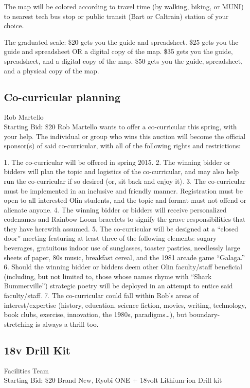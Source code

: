 \documentclass[11pt]{article}
\begin{document}
The map will be colored according to travel time (by walking, biking, or MUNI) to nearest tech bus stop or public transit (Bart or Caltrain) station of your choice. 

The graduated scale:
\$20 gets you the guide and spreadsheet.
\$25 gets you the guide and spreadsheet OR a digital copy of the map.
\$35 gets you the guide, spreadsheet, and a digital copy of the map.
\$50 gets you the guide, spreadsheet, and a physical copy of the map.
\subsection{Co-curricular planning}
Rob Martello
\\
Starting Bid: \$20
\newline
Rob Martello wants to offer a co-curricular this spring, with your help.  The individual or group who wins this auction will become the official sponsor(s) of said co-curricular, with all of the following rights and restrictions:

1.        The co-curricular will be offered in spring 2015. 
2.        The winning bidder or bidders will plan the topic and logistics of the co-curricular, and may also help run the co-curricular if so desired (or, sit back and enjoy it).
3.        The co-curricular must be implemented in an inclusive and friendly manner.  Registration must be open to all interested Olin students, and the topic and format must not offend or alienate anyone. 
4.        The winning bidder or bidders will receive personalized codenames and Rainbow Loom bracelets to signify the grave responsibilities that they have herewith assumed.
5.        The co-curricular will be designed at a “closed door” meeting featuring at least three of the following elements: sugary beverages, gratuitous indoor use of sunglasses, toaster pastries, needlessly large sheets of paper, 80s music, breakfast cereal, and the 1981 arcade game “Galaga.” 
6.        Should the winning bidder or bidders deem other Olin faculty/staff beneficial (including, but not limited to, those whose names rhyme with “Shark Bummerville”) strategic poetry will be deployed in an attempt to entice said faculty/staff.
7.        The co-curricular could fall within Rob’s areas of interest/expertise (history, education, science fiction, movies, writing, technology, book clubs, exercise, innovation, the 1980s, paradigms…), but boundary-stretching is always a thrill too.
\subsection{18v Drill Kit}
Facilities Team
\\
Starting Bid: \$20
\newline
Brand New, Ryobi ONE + 18volt Lithium-ion Drill kit
\end{document}
